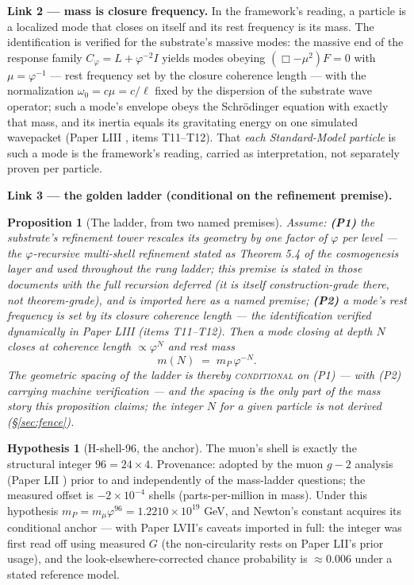 \documentclass[12pt]{article}
\newtheorem{proposition}[theorem]{Proposition}
\theoremstyle{definition}
\newtheorem{hypothesis}[theorem]{Hypothesis}
\theoremstyle{remark}
\begin{document}
\textbf{Link 2 --- mass is closure frequency.} In the framework's reading, a particle is a localized mode that closes on itself and its rest frequency is its mass. The identification is verified for the substrate's massive modes: the massive end of the response family $C_\varphi = L + \varphi^{-2}I$ yields modes obeying $(\Box - \mu^2)F = 0$ with $\mu = \varphi^{-1}$ --- rest frequency set by the closure coherence length --- with the normalization $\omega_0 = c\mu = c/\ell$ fixed by the dispersion of the substrate wave operator; such a mode's envelope obeys the Schr\"odinger equation with exactly that mass, and its inertia equals its gravitating energy on one simulated wavepacket (Paper LIII \citep{SmartLIII}, items T11--T12). That \emph{each Standard-Model particle} is such a mode is the framework's reading, carried as interpretation, not separately proven per particle.

\textbf{Link 3 --- the golden ladder (conditional on the refinement premise).}

\begin{proposition}[The ladder, from two named premises]\label{prop:ladder}
Assume: \textbf{(P1)} the substrate's refinement tower rescales its geometry by one factor of $\varphi$ per level --- the $\varphi$-recursive multi-shell refinement stated as Theorem 5.4 of the cosmogenesis layer and used throughout the rung ladder; this premise is stated in those documents with the full recursion deferred (it is itself construction-grade there, not theorem-grade), and is imported here as a named premise; \textbf{(P2)} a mode's rest frequency is set by its closure coherence length --- the identification verified dynamically in Paper LIII (items T11--T12). Then a mode closing at depth $N$ closes at coherence length $\propto \varphi^{N}$ and rest mass
$$m(N) \;=\; m_P\,\varphi^{-N}.$$
The geometric spacing of the ladder is thereby \textsc{conditional} on (P1) --- with (P2) carrying machine verification --- and the spacing is the only part of the mass story this proposition claims; the integer $N$ for a given particle is not derived (\S\ref{sec:fence}).
\end{proposition}

\begin{hypothesis}[H-shell-96, the anchor]\label{hyp:anchor}
The muon's shell is exactly the structural integer $96 = 24\times4$. Provenance: adopted by the muon $g{-}2$ analysis (Paper LII \citep{SmartLII}) prior to and independently of the mass-ladder questions; the measured offset is $-2\times10^{-4}$ shells (parts-per-million in mass). Under this hypothesis $m_P = m_\mu\varphi^{96} = 1.2210\times10^{19}$ GeV, and Newton's constant acquires its conditional anchor --- with Paper LVII's \citep{SmartLVII} caveats imported in full: the integer was first read off using measured $G$ (the non-circularity rests on Paper LII's prior usage), and the look-elsewhere-corrected chance probability is $\approx 0.006$ under a stated reference model.
\end{hypothesis}
\end{document}
